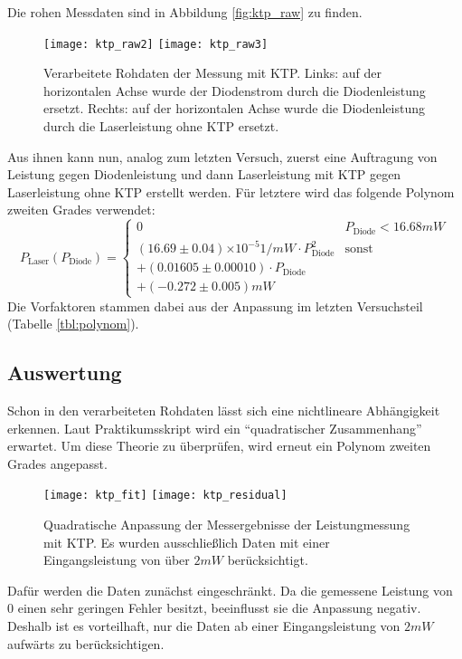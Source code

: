\documentclass{../Misc/MontavonLaTeX/Montavon}
\newcommand{\e}[1]{\ensuremath{\times 10^{#1}}}
\newcommand{\halfwidth}{0.48\textwidth}
\begin{document}
Die rohen Messdaten sind in Abbildung \ref{fig:ktp_raw} zu finden. 

\begin{figure}[htbp]
\centering
\texttt{[image: ktp\_raw2]}
\texttt{[image: ktp\_raw3]}
\caption{Verarbeitete Rohdaten der Messung mit KTP. Links: auf der horizontalen Achse wurde der Diodenstrom durch die Diodenleistung ersetzt. Rechts: auf der horizontalen Achse wurde die Diodenleistung durch die Laserleistung ohne KTP ersetzt.}
\label{fig:ktp_raw23}
\end{figure}

Aus ihnen kann nun, analog zum letzten Versuch, zuerst eine Auftragung von Leistung gegen Diodenleistung und dann Laserleistung mit KTP gegen Laserleistung ohne KTP erstellt werden.
Für letztere wird das folgende Polynom zweiten Grades verwendet:
\[
P_\textrm{Laser}(P_\textrm{Diode}) = \left\{ \begin{array}{ll} 0 & P_\textrm{Diode} < 16.68 \unit{mW} \\
(16.69 \pm 0.04) \e{-5} \unit{1/mW} \cdot P_\textrm{Diode}^2 & \textrm{sonst}  \\
+ (0.01605 \pm 0.00010) \cdot P_\textrm{Diode} & \\
+ (-0.272 \pm 0.005) \unit{mW} & \end{array} \right.
\]
Die Vorfaktoren stammen dabei aus der Anpassung im letzten Versuchsteil (Tabelle \ref{tbl:polynom}).

\subsection{Auswertung}
Schon in den verarbeiteten Rohdaten lässt sich eine nichtlineare Abhängigkeit erkennen. Laut Praktikumsskript wird ein \enquote{quadratischer Zusammenhang}\cite{anleitung1} erwartet. Um diese Theorie zu überprüfen, wird erneut ein Polynom zweiten Grades angepasst. 

\begin{figure}[htbp]
\centering
\texttt{[image: ktp\_fit]}
\texttt{[image: ktp\_residual]}
\caption{Quadratische Anpassung der Messergebnisse der Leistungmessung mit KTP. Es wurden ausschließlich Daten mit einer Eingangsleistung von über $2 \unit{mW}$ berücksichtigt.}
\label{fig:ktp_fit}
\end{figure}

Dafür werden die Daten zunächst eingeschränkt. Da die gemessene Leistung von 0 einen sehr geringen Fehler besitzt, beeinflusst sie die Anpassung negativ. Deshalb ist es vorteilhaft, nur die Daten ab einer Eingangsleistung von $2 \unit{mW}$ aufwärts zu berücksichtigen.
\end{document}
